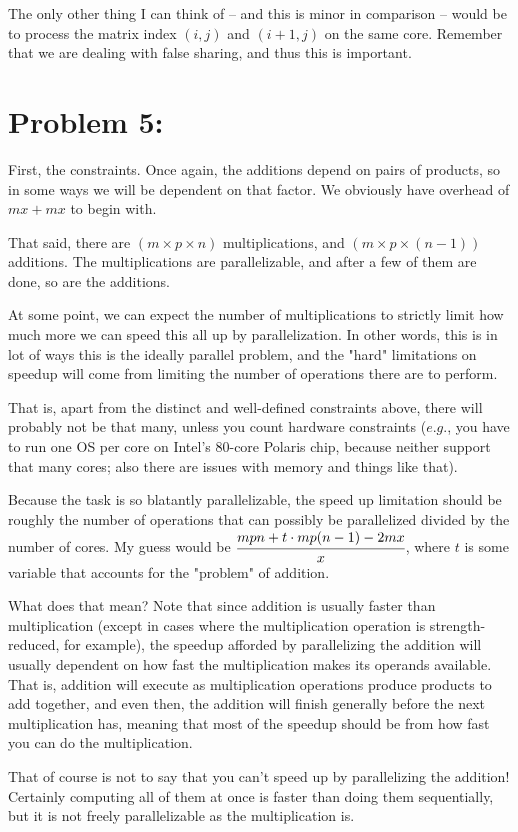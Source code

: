 \documentclass[a4paper]{article}
\begin{document}
The only other thing I can think of -- and this is minor in comparison -- would be to process the matrix index $(i,j)$ and $(i+1,j)$ on the same core. Remember that we are dealing with false sharing, and thus this is important.

\section*{Problem 5:} First, the constraints. Once again, the additions depend on pairs of products, so in some ways we will be dependent on that factor. We obviously have overhead of $mx + mx$ to begin with.

That said, there are $(m \times p \times n)$ multiplications, and $(m \times p \times (n-1))$ additions. The multiplications are parallelizable, and after a few of them are done, so are the additions.

At some point, we can expect the number of multiplications to strictly limit how much more we can speed this all up by parallelization. In other words, this is in lot of ways this is the ideally parallel problem, and the "hard" limitations on speedup will come from limiting the number of operations there are to perform.

That is, apart from the distinct and well-defined constraints above, there will probably not be that many, unless you count hardware constraints ($\textit{e.g.}$, you have to run one OS per core on Intel's 80-core Polaris chip, because neither support that many cores; also there are issues with memory and things like that).

Because the task is so blatantly parallelizable, the speed up limitation should be roughly the number of operations that can possibly be parallelized divided by the number of cores. My guess would be $\cfrac{mpn + t \cdot mp(n-1) - 2mx}{x}$, where $t$ is some variable that accounts for the "problem" of addition.

What does that mean? Note that since addition is usually faster than multiplication (except in cases where the multiplication operation is strength-reduced, for example), the speedup afforded by parallelizing the addition will usually dependent on how fast the multiplication makes its operands available. That is, addition will execute as multiplication operations produce products to add together, and even then, the addition will finish generally before the next multiplication has, meaning that most of the speedup should be from how fast you can do the multiplication.

That of course is not to say that you can't speed up by parallelizing the addition! Certainly computing all of them at once is faster than doing them sequentially, but it is not freely parallelizable as the multiplication is.
\end{document}
